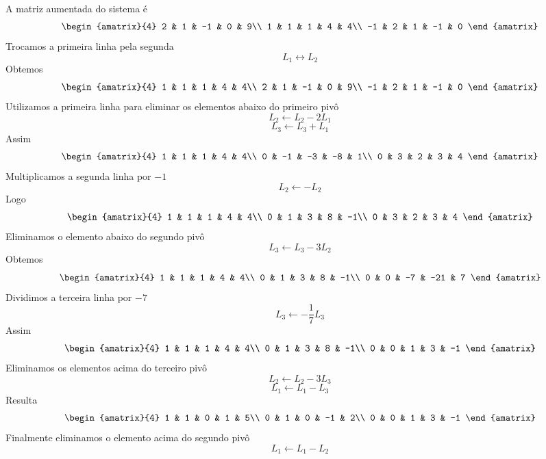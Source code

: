 \documentclass[a4paper,12pt,fleqn]{article}
\begin{document}
\begin{answer}
A matriz aumentada do sistema é
\[
\begin{amatrix}{4}
  2 & 1 & -1 &  0 & 9\\
  1 & 1 &  1 &  4 & 4\\
 -1 & 2 &  1 & -1 & 0
\end{amatrix}
\]
Trocamos a primeira linha pela segunda
\[
L_1\leftrightarrow L_2
\]
Obtemos
\[
\begin{amatrix}{4}
  1 & 1 &  1 &  4 & 4\\
  2 & 1 & -1 &  0 & 9\\
 -1 & 2 &  1 & -1 & 0
\end{amatrix}
\]
Utilizamos a primeira linha para eliminar os elementos abaixo do primeiro pivô
\[
L_2\leftarrow L_2-2L_1
\]
\[
L_3\leftarrow L_3+L_1
\]
Assim
\[
\begin{amatrix}{4}
  1 & 1  &  1 &  4 & 4\\
  0 & -1 & -3 & -8 & 1\\
  0 & 3  &  2 &  3 & 4
\end{amatrix}
\]
Multiplicamos a segunda linha por $-1$
\[
L_2\leftarrow -L_2
\]
Logo
\[
\begin{amatrix}{4}
  1 & 1 & 1 & 4 & 4\\
  0 & 1 & 3 & 8 & -1\\
  0 & 3 & 2 & 3 & 4
\end{amatrix}
\]
Eliminamos o elemento abaixo do segundo pivô
\[
L_3\leftarrow L_3-3L_2
\]
Obtemos
\[
\begin{amatrix}{4}
  1 & 1 &  1 &  4 &  4\\
  0 & 1 &  3 &  8 & -1\\
  0 & 0 & -7 & -21 & 7
\end{amatrix}
\]
Dividimos a terceira linha por $-7$
\[
L_3\leftarrow -\frac{1}{7}L_3
\]
Assim
\[
\begin{amatrix}{4}
  1 & 1 & 1 & 4 &  4\\
  0 & 1 & 3 & 8 & -1\\
  0 & 0 & 1 & 3 & -1
\end{amatrix}
\]
Eliminamos os elementos acima do terceiro pivô
\[
L_2\leftarrow L_2-3L_3
\]
\[
L_1\leftarrow L_1-L_3
\]
Resulta
\[
\begin{amatrix}{4}
  1 & 1 & 0 &  1 & 5\\
  0 & 1 & 0 & -1 & 2\\
  0 & 0 & 1 &  3 & -1
\end{amatrix}
\]
Finalmente eliminamos o elemento acima do segundo pivô
\[
L_1\leftarrow L_1-L_2
\]
\end{answer}
\end{document}
